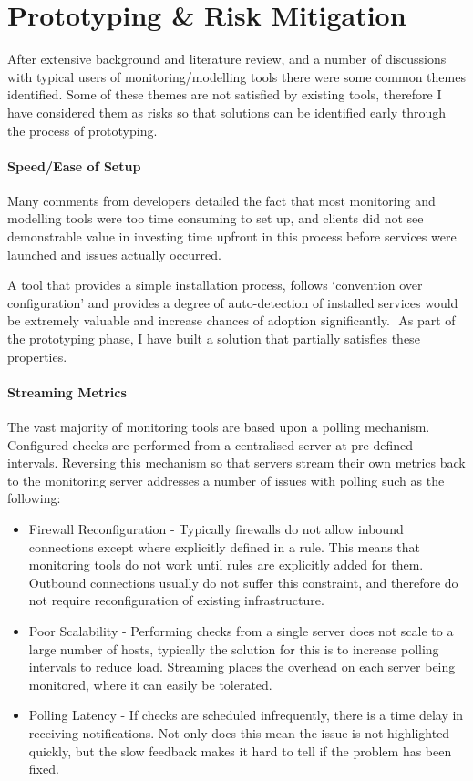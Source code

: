 \documentclass{cshonours}
\begin{document}
\section{Prototyping \& Risk Mitigation}

After extensive background and literature review, and a number of discussions with typical users of monitoring/modelling tools there were some common themes identified. Some of these themes are not satisfied by existing tools, therefore I have considered them as risks so that solutions can be identified early through the process of prototyping.

\paragraph{Speed/Ease of Setup} Many comments from developers detailed the fact that most monitoring and modelling tools were too time consuming to set up, and clients did not see demonstrable value in investing time upfront in this process before services were launched and issues actually occurred. 

A tool that provides a simple installation process, follows ‘convention over configuration’ and provides a degree of auto-detection of installed services would be extremely valuable and increase chances of adoption significantly.
 As part of the prototyping phase, I have built a solution that partially satisfies these properties.

\pagebreak
\paragraph{Streaming Metrics} The vast majority of monitoring tools are based upon a polling mechanism. Configured checks are performed from a centralised server at pre-defined intervals. Reversing this mechanism so that servers stream their own metrics back to the monitoring server addresses a number of issues with polling such as the following:

\begin{itemize}
  \item Firewall Reconfiguration - Typically firewalls do not allow inbound connections except where explicitly defined in a rule. This means that monitoring tools do not work until rules are explicitly added for them. Outbound connections usually do not suffer this constraint, and therefore do not require reconfiguration of existing infrastructure.
  \item Poor Scalability - Performing checks from a single server does not scale to a large number of hosts, typically the solution for this is to increase polling intervals to reduce load. Streaming places the overhead on each server being monitored, where it can easily be tolerated.
  \item Polling Latency - If checks are scheduled infrequently, there is a time delay in receiving notifications. Not only does this mean the issue is not highlighted quickly, but the slow feedback makes it hard to tell if the problem has been fixed.
\end{itemize}
\end{document}
